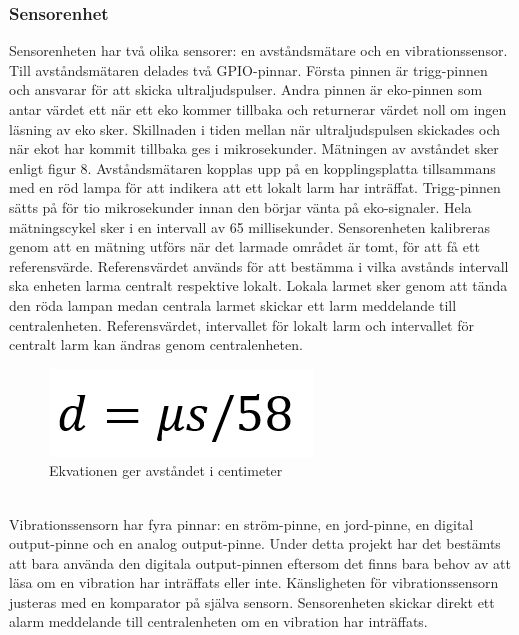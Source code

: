 \documentclass{article}
\begin{document}
\subsubsection{Sensorenhet}
Sensorenheten har två olika sensorer: en avståndsmätare och en vibrationssensor. Till avståndsmätaren delades två GPIO-pinnar. Första pinnen är trigg-pinnen och ansvarar för att skicka ultraljudspulser. Andra pinnen är eko-pinnen som antar värdet ett när ett eko kommer tillbaka och returnerar värdet noll om ingen läsning av eko sker. Skillnaden i tiden mellan när ultraljudspulsen skickades och när ekot har kommit tillbaka ges i mikrosekunder. Mätningen av avståndet sker enligt figur 8. Avståndsmätaren kopplas upp på en kopplingsplatta tillsammans med en röd lampa för att indikera att ett lokalt larm har inträffat. Trigg-pinnen sätts på för tio mikrosekunder innan den börjar vänta på eko-signaler. Hela mätningscykel sker i en intervall av 65 millisekunder. Sensorenheten kalibreras genom att en mätning utförs när det larmade området är tomt, för att få ett referensvärde. Referensvärdet används för att bestämma i vilka avstånds intervall ska enheten larma centralt respektive lokalt. Lokala larmet sker genom att tända den röda lampan medan centrala larmet skickar ett larm meddelande till centralenheten. Referensvärdet, intervallet för lokalt larm och intervallet för centralt larm kan ändras genom centralenheten.
\begin{figure}[h]
    \centering
    \includegraphics[scale=0.5]{Projektrapport/ekvation.png}
    \caption {Ekvationen ger avståndet i centimeter }
    \label{fig:drawing}
\end{figure}
\\
Vibrationssensorn har fyra pinnar: en ström-pinne, en jord-pinne, en digital output-pinne och en analog output-pinne. Under detta projekt har det bestämts att bara använda den digitala output-pinnen eftersom det finns bara behov av att läsa om en vibration har inträffats eller inte. Känsligheten för vibrationssensorn justeras med en komparator på själva sensorn. Sensorenheten skickar direkt ett alarm meddelande till centralenheten om en vibration har inträffats.
\end{document}
